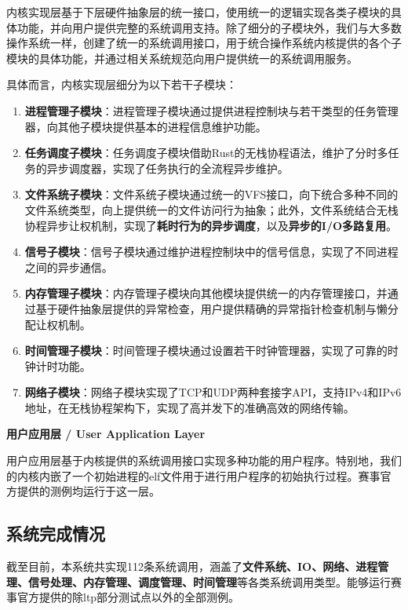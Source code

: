 \documentclass{article}
\begin{document}
内核实现层基于下层硬件抽象层的统一接口，使用统一的逻辑实现各类子模块的具体功能，并向用户提供完整的系统调用支持。除了细分的子模块外，我们与大多数操作系统一样，创建了统一的系统调用接口，用于统合操作系统内核提供的各个子模块的具体功能，并通过相关系统规范向用户提供统一的系统调用服务。

具体而言，内核实现层细分为以下若干子模块：

\begin{enumerate}
    \item \textbf{进程管理子模块}：进程管理子模块通过提供进程控制块与若干类型的任务管理器，向其他子模块提供基本的进程信息维护功能。
    \item \textbf{任务调度子模块}：任务调度子模块借助Rust的无栈协程语法，维护了分时多任务的异步调度器，实现了任务执行的全流程异步维护。
    \item \textbf{文件系统子模块}：文件系统子模块通过统一的VFS接口，向下统合多种不同的文件系统类型，向上提供统一的文件访问行为抽象；此外，文件系统结合无栈协程异步让权机制，实现了\textbf{耗时行为的异步调度}，以及\textbf{异步的I/O多路复用}。
    \item \textbf{信号子模块}：信号子模块通过维护进程控制块中的信号信息，实现了不同进程之间的异步通信。
    \item \textbf{内存管理子模块}：内存管理子模块向其他模块提供统一的内存管理接口，并通过基于硬件抽象层提供的异常检查，用户提供精确的异常指针检查机制与懒分配让权机制。
    \item \textbf{时间管理子模块}：时间管理子模块通过设置若干时钟管理器，实现了可靠的时钟计时功能。
    \item \textbf{网络子模块}：网络子模块实现了TCP和UDP两种套接字API，支持IPv4和IPv6地址，在无栈协程架构下，实现了高并发下的准确高效的网络传输。
\end{enumerate}

\quad \textbf{用户应用层 / User Application Layer}

用户应用层基于内核提供的系统调用接口实现多种功能的用户程序。特别地，我们的内核内嵌了一个初始进程的elf文件用于进行用户程序的初始执行过程。赛事官方提供的测例均运行于这一层。

\subsection{系统完成情况}
截至目前，本系统共实现112条系统调用，涵盖了\textbf{文件系统、IO、网络、进程管理、信号处理、内存管理、调度管理、时间管理}等各类系统调用类型。能够运行赛事官方提供的除ltp部分测试点以外的全部测例。
\end{document}
